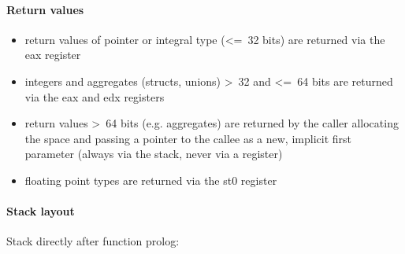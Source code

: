 \paragraph{Return values}

\begin{itemize}
\item return values of pointer or integral type (\textless=\ 32 bits) are returned via the eax register
\item integers and aggregates (structs, unions) \textgreater\ 32 and \textless=\ 64 bits are returned via the eax and edx registers
\item return values \textgreater\ 64 bits (e.g. aggregates) are returned by the caller allocating the space and
passing a pointer to the callee as a new, implicit first parameter (always via the stack, never via a register)
\item floating point types are returned via the st0 register
\end{itemize}


\paragraph{Stack layout}

Stack directly after function prolog:\\

